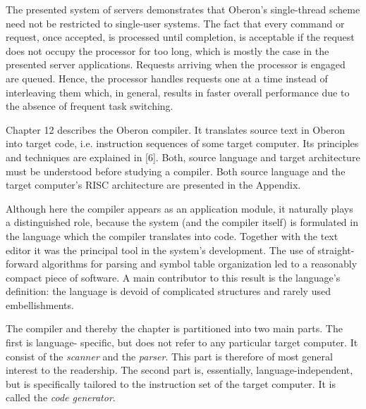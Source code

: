 The presented system of servers demonstrates that Oberon's
single-thread scheme need not be restricted to single-user
systems. The fact that every command or request, once accepted, is
processed until completion, is acceptable if the request does not
occupy the processor for too long, which is mostly the case in the
presented server applications. Requests arriving when the processor is
engaged are queued. Hence, the processor handles requests one at a
time instead of interleaving them which, in general, results in faster
overall performance due to the absence of frequent task switching.

Chapter 12 describes the Oberon compiler. It translates source text in
Oberon into target code, i.e. instruction sequences of some target
computer. Its principles and techniques are explained in [6]. Both,
source language and target architecture must be understood before
studying a compiler. Both source language and the target computer's
RISC architecture are presented in the Appendix.

Although here the compiler appears as an application module, it
naturally plays a distinguished role, because the system (and the
compiler itself) is formulated in the language which the compiler
translates into code. Together with the text editor it was the
principal tool in the system's development. The use of
straight-forward algorithms for parsing and symbol table organization
led to a reasonably compact piece of software. A main contributor to
this result is the language's definition: the language is devoid of
complicated structures and rarely used embellishments.

The compiler and thereby the chapter is partitioned into two main
parts. The first is language- specific, but does not refer to any
particular target computer. It consist of the {\it scanner\/} and the
{\it parser\/}. This part is therefore of most general interest to the
readership. The second part is, essentially, language-independent, but
is specifically tailored to the instruction set of the target
computer. It is called the {\it code generator\/}.

